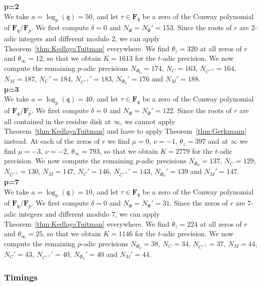 \documentclass[a4paper,11pt]{article}
\numberwithin{equation}{section}
\newcommand{\FF}{\mathbf{F}} %
\theoremstyle{definition}
\begin{document}
\textbf{p=2} \\

We take $a=\log_p(\mathfrak{q})=50$, and let $\tau \in \FF_{\mathfrak{q}}$ 
be a zero of the Conway polynomial of $\FF_{\mathfrak{q}}/\FF_p$. We first compute
$\delta=0$ and $N_{\Phi}=N_{\Phi}'=153$. Since the roots of $r$ are $2$-adic integers and 
different modulo $2$, we can apply Theorem~\ref{thm:KedlayaTuitman} everywhere. 
We find $\theta_z=320$ at all zeros of $r$ and $\theta_{\infty}=12$, so that we
obtain $K=1613$ for the $t$-adic precision. We now compute the remaining $p$-adic 
precisions
$N_{\Phi_0}=174$, $N_C=163$, $N_{C^{-1}}=164$, $N_M=187$, 
$N_C'=184$, $N_{C^{-1}}'=183$, $N_{\Phi_0}'=176$ and $N_M'=188$. \\

\noindent \textbf{p=3} \\

We take $a=\log_p(\mathfrak{q})=40$, and let $\tau \in \FF_{\mathfrak{q}}$ 
be a zero of the Conway polynomial of $\FF_{\mathfrak{q}}/\FF_p$. We first compute
$\delta=0$ and $N_{\Phi}=N_{\Phi}'=122$. Since the roots of $r$ are all contained
in the residue disk at $\infty$, we cannot apply Theorem~\ref{thm:KedlayaTuitman}
and have to apply Theorem~\ref{thm:Gerkmann} instead. At each of the zeros of $r$
we find $\mu=0$, $\nu=-1$, $\theta_z=397$ and at $\infty$ we find 
$\mu=-3$, $\nu=-2$, $\theta_{\infty}=793$, so that we obtain $K=2779$ for the
$t$-adic precision. We now compute the remaining $p$-adic 
precisions
$N_{\Phi_0}=137$, $N_C=129$, $N_{C^{-1}}=130$, $N_M=147$, 
$N_C'=146$, $N_{C^{-1}}'=143$, $N_{\Phi_0}'=139$ and $N_M'=147$. \\

\noindent \textbf{p=7} \\

We take $a=\log_p(\mathfrak{q})=10$, and let $\tau \in \FF_{\mathfrak{q}}$ 
be a zero of the Conway polynomial of $\FF_{\mathfrak{q}}/\FF_p$. We first compute
$\delta=0$ and $N_{\Phi}=N_{\Phi}'=31$. Since the zeros of $r$ are $7$-adic integers and 
different modulo $7$, we can apply Theorem~\ref{thm:KedlayaTuitman} everywhere. 
We find $\theta_z=224$ at all zeros of $r$ and $\theta_{\infty}=25$, so that we
obtain $K=1146$ for the $t$-adic precision. We now compute the remaining $p$-adic 
precisions
$N_{\Phi_0}=38$, $N_C=34$, $N_{C^{-1}}=37$, $N_M=44$, 
$N_C'=43$, $N_{C^{-1}}'=40$, $N_{\Phi_0}'=40$ and $N_M'=44$.

\subsubsection{Timings}
\end{document}
